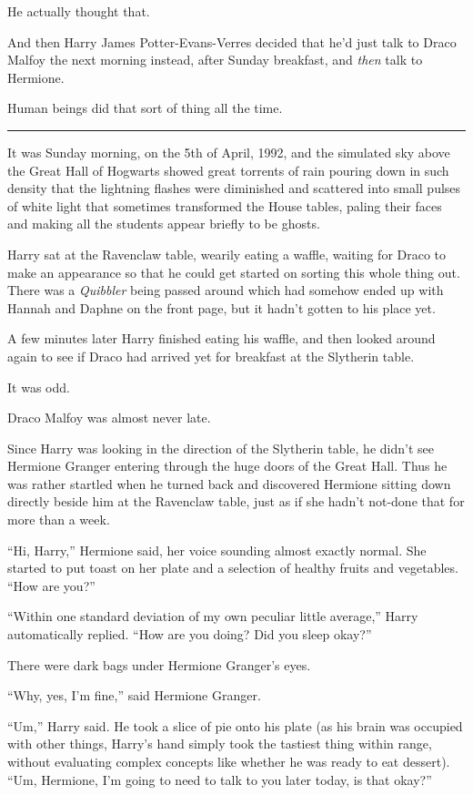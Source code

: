 He actually thought that.

And then Harry James Potter-Evans-Verres decided that he'd just talk to Draco Malfoy the next morning instead, after Sunday breakfast, and \emph{then} talk to Hermione.

Human beings did that sort of thing all the time.

\begin{center}\rule{3in}{0.4pt}\end{center}

It was Sunday morning, on the 5th of April, 1992, and the simulated sky above the Great Hall of Hogwarts showed great torrents of rain pouring down in such density that the lightning flashes were diminished and scattered into small pulses of white light that sometimes transformed the House tables, paling their faces and making all the students appear briefly to be ghosts.

Harry sat at the Ravenclaw table, wearily eating a waffle, waiting for Draco to make an appearance so that he could get started on sorting this whole thing out. There was a \emph{Quibbler} being passed around which had somehow ended up with Hannah and Daphne on the front page, but it hadn't gotten to his place yet.

A few minutes later Harry finished eating his waffle, and then looked around again to see if Draco had arrived yet for breakfast at the Slytherin table.

It was odd.

Draco Malfoy was almost never late.

Since Harry was looking in the direction of the Slytherin table, he didn't see Hermione Granger entering through the huge doors of the Great Hall. Thus he was rather startled when he turned back and discovered Hermione sitting down directly beside him at the Ravenclaw table, just as if she hadn't not-done that for more than a week.

``Hi, Harry,'' Hermione said, her voice sounding almost exactly normal. She started to put toast on her plate and a selection of healthy fruits and vegetables. ``How are you?''

``Within one standard deviation of my own peculiar little average,'' Harry automatically replied. ``How are you doing? Did you sleep okay?''

There were dark bags under Hermione Granger's eyes.

``Why, yes, I'm fine,'' said Hermione Granger.

``Um,'' Harry said. He took a slice of pie onto his plate (as his brain was occupied with other things, Harry's hand simply took the tastiest thing within range, without evaluating complex concepts like whether he was ready to eat dessert). ``Um, Hermione, I'm going to need to talk to you later today, is that okay?''

